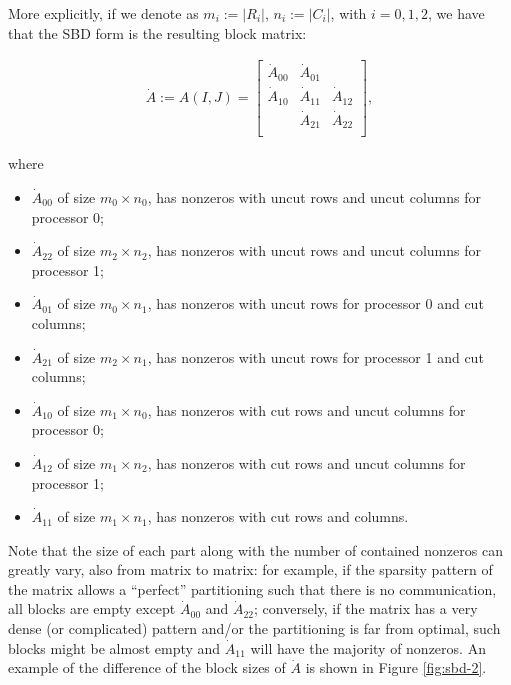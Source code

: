 More explicitly, if we denote as $m_i := |R_i|$, $n_i := |C_i|$, with $i=0,1,2$, we have that the SBD form is the resulting block matrix:

\begin{align}\dot{A} := A(I,J) = 
	\begin{bmatrix}
		\dot{A}_{00} & \dot{A}_{01}  & \\
		\dot{A}_{10} & \dot{A}_{11} & \dot{A}_{12} \\
		& \dot{A}_{21} & \dot{A}_{22} \\ 
	\end{bmatrix}, \label{eq:sbd}
\end{align}

where

\begin{itemize}
	\item $\dot{A}_{00}$ of size $m_0 \times n_0$, has nonzeros with uncut rows and uncut columns for processor 0;
	\item $\dot{A}_{22}$ of size $m_2 \times n_2$, has nonzeros with uncut rows and uncut columns for processor 1;
	\item $\dot{A}_{01}$ of size $m_0 \times n_1$, has nonzeros with uncut rows for processor 0 and cut columns;
	\item $\dot{A}_{21}$ of size $m_2 \times n_1$, has nonzeros with uncut rows for processor 1 and cut columns;
	\item $\dot{A}_{10}$ of size $m_1 \times n_0$, has nonzeros with cut rows and uncut columns for processor 0;
	\item $\dot{A}_{12}$ of size $m_1 \times n_2$, has nonzeros with cut rows and uncut columns for processor 1;
	\item $\dot{A}_{11}$ of size $m_1 \times n_1$, has nonzeros with cut rows and columns.
\end{itemize}

Note that the size of each part along with the number of contained nonzeros can greatly vary, also from matrix to matrix: for example, if the sparsity pattern of the matrix allows a ``perfect'' partitioning such that there is no communication, all blocks are empty except $\dot{A}_{00}$ and $\dot{A}_{22}$; conversely, if the matrix has a very dense (or complicated) pattern and/or the partitioning is far from optimal, such blocks might be almost empty and $\dot{A}_{11}$ will have the majority of nonzeros. An example of the difference of the block sizes of $\dot{A}$ is shown in Figure \ref{fig:sbd-2}.

